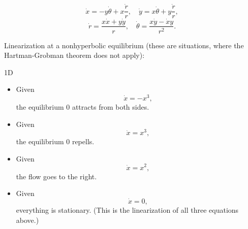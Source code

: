 \documentclass{article}
\begin{document}
$$\dot x=-y\dot \theta +x\frac{\dot r}{r}, \quad
\dot y = x\dot \theta +y\frac{\dot r}{r},$$
$$\dot r = \frac{x\dot x + y\dot y}{r}, \quad
\dot \theta = \frac{x\dot y-\dot xy}{r^2}.$$

Linearization at a nonhyperbolic equilibrium (these are situations, where the Hartman-Grobman theorem does not apply):

\begin{exam}
    1D
    \begin{itemize}
        \item Given
        $$\dot x = -x^3,$$
        the equilibrium $0$ attracts from both sides.

        \item Given
        $$\dot x = x^3,$$
        the equilibrium $0$ repells.

        \item Given
        $$\dot x = x^2,$$
        the flow goes to the right.

        \item Given
        $$\dot x = 0,$$
        everything is stationary. (This is the linearization of all three equations above.)
    \end{itemize}

\end{exam}
\end{document}
